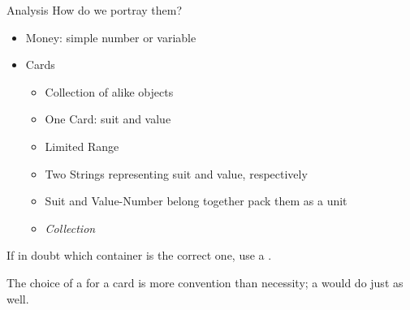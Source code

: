 \begin{frame}[fragile]{Analysis}
%
How do we portray them?
\begin{itemize}
\item Money: simple number \thus {} or  variable
\item Cards
	\begin{itemize}
	\item Collection of alike objects
	\item One Card: suit and value
	\item Limited Range
	\item Two Strings representing suit and value, respectively
	\item Suit and Value-Number belong together \thus pack them as a unit \thus {}
	\item \emph{Collection} \thus {}
	\end{itemize}
\end{itemize}
%
\begin{hintbox}
If in doubt which container is the correct one, use a .

The choice of a  for a card is more convention than necessity; a  would do just as well.
\end{hintbox}
%
\end{frame}


